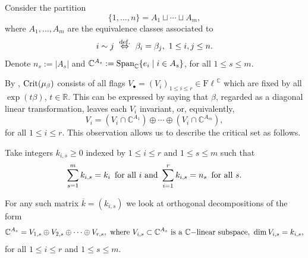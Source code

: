 \documentclass[12pt]{amsart}
\theoremstyle{definition}
\theoremstyle{remark}
\newcommand{\RR}{\mathbb R}
\newcommand{\CC}{\mathbb C}
\newcommand{\Fl}{{\mathrm{F\ell}}}
\begin{document}
Consider the partition
\begin{equation} \label{1dotsn}\{1, \ldots,n\} = A_1 \sqcup \cdots \sqcup A_m,\end{equation}
where $A_1, \ldots, A_m$ are the equivalence classes associated to $$i\sim j 
 \ \stackrel{{\rm def.}}{\Leftrightarrow} \  \beta_i=\beta_j, \ 1\le i,j\le n.$$  
 Denote $n_s:=|A_s|$ and $\CC^{A_s}:={\rm Span}_\CC \{e_i \mid i\in A_s\}$, for all $1\le s \le m$.
 
By \cite[Sec.~3.7]{Ki}, ${\rm Crit}(\mu_\beta)$ consists of all flags $V_\bullet=(V_i)_{1\le i \le r}\in \Fl^\CC$ which are fixed by all $\exp(t\beta)$, $t\in \RR$.
This can be expressed by saying that $\beta$, regarded as a diagonal linear transformation, leaves each $V_i$ invariant, or, equivalently,
$$
V_i=(V_i\cap \CC^{A_1}) \oplus \cdots \oplus (V_i \cap \CC^{A_m}),
$$
for all $1\le i \le r$. This observation allows us to describe the critical set as follows.
 








Take integers $k_{i,s} \ge 0$ indexed by
$1 \le i \le r$  and $1 \le s \le m$ 
such that
\begin{equation}
\sum_{s=1}^m k_{i,s} = k_i \,\text{ for all } i \ {\rm and} \ 
\sum_{i=1}^r k_{i,s} = n_s \,\text{ for all } s.
\label{eq:matching}
\end{equation}


For any such  matrix $\overline{k} = (k_{i,s})$ we look at orthogonal  decompositions of the form
\begin{equation}\label{cs}
\CC^{A_s} = V_{1,s} \oplus V_{2,s} \oplus \cdots \oplus V_{r,s}, \ {\rm where} \  V_{i,s}\subset \CC^{A_s} \ {\rm is \ a \ } \CC{\rm -linear  \
subspace}, \ \dim V_{i,s} = k_{i,s},
\end{equation} for  all   $1\le i \le r$ and $1\le s \le m.$
\end{document}
